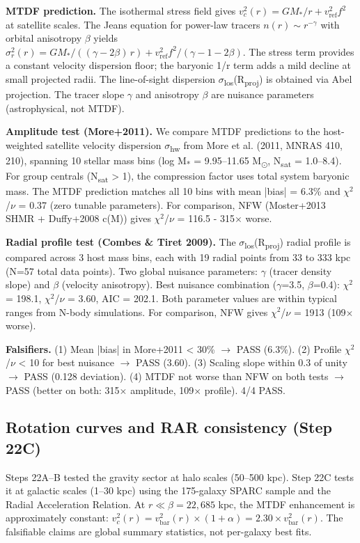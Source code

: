 \documentclass[11pt,a4paper]{article}
\begin{document}
\textbf{MTDF prediction.} The isothermal stress field gives \(v_c^2(r) = GM_*/r + v_{\mathrm{ref}}^2 f^2\) at satellite scales. The Jeans equation for power-law tracers \(n(r) \sim r^{-\gamma}\) with orbital anisotropy $\beta$ yields \(\sigma_r^2(r) = GM_*/((\gamma - 2\beta)\,r) + v_{\mathrm{ref}}^2 f^2/(\gamma - 1 - 2\beta)\). The stress term provides a constant velocity dispersion floor; the baryonic 1/\allowbreak{}r term adds a mild decline at small projected radii. The line-of-sight dispersion $\sigma$\textsubscript{los}(R\textsubscript{proj}) is obtained via Abel projection. The tracer slope $\gamma$ and anisotropy $\beta$ are nuisance parameters (astrophysical, not MTDF).

\textbf{Amplitude test (More+2011).} We compare MTDF predictions to the host-weighted satellite velocity dispersion $\sigma$\textsubscript{hw} from More et al. (2011, MNRAS 410, 210), spanning 10 stellar mass bins (log M\textsubscript{*} = 9.95--11.65 M\textsubscript{$\odot$}, N\textsubscript{sat} = 1.0--8.4). For group centrals (N\textsubscript{sat} > 1), the compression factor uses total system baryonic mass. The MTDF prediction matches all 10 bins with mean |bias| = 6.3\% and $\chi$$^{2}$/$\nu$ = 0.37 (zero tunable parameters). For comparison, NFW (Moster+2013 SHMR + Duffy+2008 c(M)) gives $\chi$$^{2}$/$\nu$ = 116.5  -  315$\times$ worse.

\textbf{Radial profile test (Combes \& Tiret 2009).} The $\sigma$\textsubscript{los}(R\textsubscript{proj}) radial profile is compared across 3 host mass bins, each with 19 radial points from 33 to 333 kpc (N=57 total data points). Two global nuisance parameters: $\gamma$ (tracer density slope) and $\beta$ (velocity anisotropy). Best nuisance combination ($\gamma$=3.5, $\beta$=0.4): $\chi$$^{2}$ = 198.1, $\chi$$^{2}$/$\nu$ = 3.60, AIC = 202.1. Both parameter values are within typical ranges from N-body simulations. For comparison, NFW gives $\chi$$^{2}$/$\nu$ = 1913 (109$\times$ worse).

\textbf{Falsifiers.} (1) Mean |bias| in More+2011 < 30\% $\rightarrow$ PASS (6.3\%). (2) Profile $\chi$$^{2}$/$\nu$ < 10 for best nuisance $\rightarrow$ PASS (3.60). (3) Scaling slope within 0.3 of unity $\rightarrow$ PASS (0.128 deviation). (4) MTDF not worse than NFW on both tests $\rightarrow$ PASS (better on both: 315$\times$ amplitude, 109$\times$ profile). 4/\allowbreak{}4 PASS.

\subsection{Rotation curves and RAR consistency (Step 22C)}
Steps 22A--B tested the gravity sector at halo scales (50--500 kpc). Step 22C tests it at galactic scales (1--30 kpc) using the 175-galaxy SPARC sample and the Radial Acceleration Relation. At \(r \ll \beta = 22{,}685\) kpc, the MTDF enhancement is approximately constant: \(v_c^2(r) = v_{\mathrm{bar}}^2(r) \times (1 + \alpha) = 2.30 \times v_{\mathrm{bar}}^2(r)\). The falsifiable claims are global summary statistics, not per-galaxy best fits.
\end{document}
